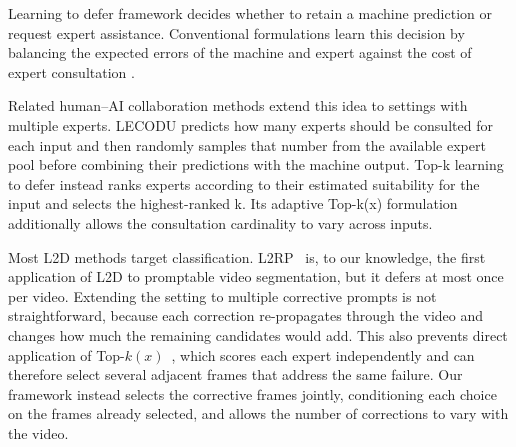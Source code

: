 Learning to defer framework decides whether to retain a machine prediction or request expert assistance. Conventional formulations learn this decision by balancing the expected errors of the machine and expert against the cost of expert consultation \cite{mao2023two, mozannar2020consistent,verma2022calibrated,hemmer2304learning}.

Related human–AI collaboration methods extend this idea to settings with multiple experts. LECODU \cite{zhang2024learning} predicts how many experts should be consulted for each input and then randomly samples that number from the available expert pool before combining their predictions with the machine output. Top-k \cite{montreuil2025ask} learning to defer instead ranks experts according to their estimated suitability for the input and selects the highest-ranked k. Its adaptive Top-k(x) formulation additionally allows the consultation cardinality to vary across inputs.

Most L2D methods target classification.
L2RP~\cite{rasanjalee2026understanding} is, to our knowledge, the first application of L2D to promptable video segmentation, but it defers at most once per video.
Extending the setting to multiple corrective prompts is not straightforward, because each correction re-propagates through the video and changes how much the remaining candidates would add.
This also prevents direct application of Top-\(k(x)\)~\cite{montreuil2025ask}, which scores each expert independently and can therefore select several adjacent frames that address the same failure.
Our framework instead selects the corrective frames jointly, conditioning each choice on the frames already selected, and allows the number of corrections to vary with the video.
